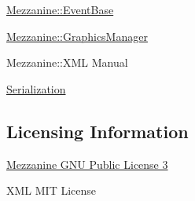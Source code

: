 \hyperlink{classMezzanine_1_1EventBase}{Mezzanine::EventBase}

\hyperlink{classMezzanine_1_1GraphicsManager}{Mezzanine::GraphicsManager}

Mezzanine::XML Manual

\hyperlink{Serialization}{Serialization}\hypertarget{index_Licensing}{}\subsection{Licensing Information}\label{index_Licensing}
\hyperlink{GPLLicense}{Mezzanine GNU Public License 3}

XML MIT License 